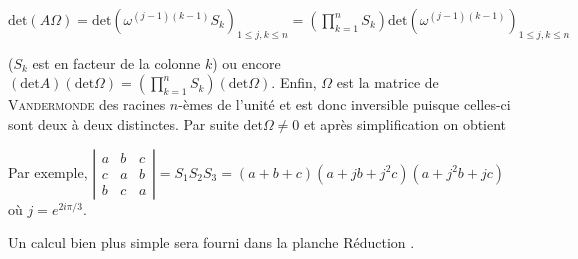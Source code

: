 {{\begin{center}
$\text{det}(A\Omega)=\text{det}\left(\omega^{(j-1)(k-1)}S_k\right)_{1\leqslant j,k\leqslant n}=\left(\prod_{k=1}^{n}S_k\right)\text{det}(\omega^{(j-1)(k-1)})_{1\leqslant j,k\leqslant n}$
\end{center}

($S_k$ est en facteur de la colonne $k$) ou encore $(\text{det}A)(\text{det}\Omega)=\left(\prod_{k=1}^{n}S_k\right)(\text{det}\Omega)$. Enfin, $\Omega$ est la matrice de \textsc{Vandermonde} des racines $n$-èmes de l'unité et est donc inversible puisque celles-ci sont deux à deux distinctes. Par suite $\text{det}\Omega\neq0$ et après simplification on obtient

\begin{center}
\end{center}

Par exemple, $\left|
\begin{array}{ccc}
a&b&c\\
c&a&b\\
b&c&a
\end{array}
\right|=S_1S_2S_3 =(a+b+c)(a+jb+j^2c)(a+j^2b+jc)$ où $j =e^{2i\pi/3}$.

Un calcul bien plus simple sera fourni dans la planche \og Réduction \fg.
}
}
